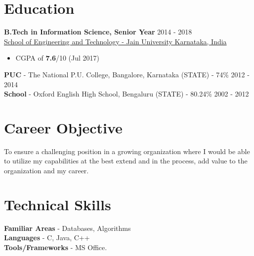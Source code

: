 \documentclass[margin, centered]{res}
\begin{document}
\begin{resume}

\section{Education}
\textbf{B.Tech in Information Science, Senior Year} \hfill 2014 - 2018 \\
\href{https://set.jainuniversity.ac.in/}{School of Engineering and Technology - Jain University Karnataka, India}
\begin{itemize}
 \item CGPA of \textbf{7.6}/10 (Jul 2017)
\end{itemize}
\textbf{PUC} - {The National P.U. College, Bangalore, Karnataka} (STATE) - 74\% \hfill 2012 - 2014 \\
\textbf{School} - Oxford English High School, Bengaluru (STATE) - 80.24\% \hfill 2002 - 2012


\section{Career \hspace{2mm} Objective}
To ensure a challenging position in a growing organization where I would be able to utilize my capabilities at the best extend and in the process, add value to the organization and my career.


\section{Technical \hspace{2mm} Skills}
\textbf{Familiar Areas} - Databases, Algorithms \\
\textbf{Languages} - C, Java, C++\\
\textbf{Tools/Frameworks} - MS Office.





\end{resume}
\end{document}
